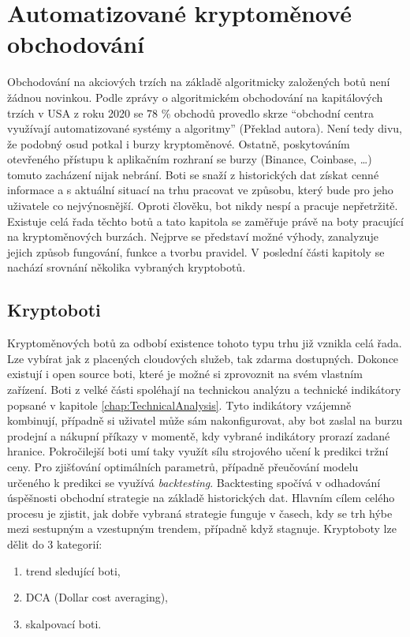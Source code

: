 \chapter{Automatizované kryptoměnové obchodování}
\label{sec:Cryptobots}
Obchodování na akciových trzích na základě algoritmicky založených botů není žádnou novinkou. Podle zprávy o algoritmickém obchodování na kapitálových trzích v USA z roku 2020 %
se 78 \% obchodů provedlo skrze \enquote{obchodní centra využívají automatizované systémy a algoritmy} (Překlad autora). Není tedy divu, že podobný osud potkal i burzy
kryptoměnové. Ostatně, poskytováním otevřeného přístupu k aplikačním rozhraní se burzy (Binance, Coinbase, \ldots) tomuto zacházení nijak nebrání. Boti se snaží z historických
dat získat cenné informace a s aktuální situací na trhu pracovat ve způsobu, který bude pro jeho uživatele co nejvýnosnější. Oproti člověku, bot nikdy nespí a pracuje
nepřetržitě. Existuje celá řada těchto botů a tato kapitola se zaměřuje právě na boty pracující na kryptoměnových burzách. Nejprve se představí možné výhody,
zanalyzuje jejich způsob fungování, funkce a tvorbu pravidel. V poslední části kapitoly se nachází srovnání několika vybraných kryptobotů.

\section{Kryptoboti}
Kryptoměnových botů za odbobí existence tohoto typu trhu již vznikla celá řada. Lze vybírat jak z placených cloudových služeb, tak zdarma dostupných. Dokonce existují i open
source boti, které je možné si zprovoznit na svém vlastním zařízení. Boti z velké části spoléhají na technickou analýzu a technické indikátory popsané v kapitole \ref{chap:TechnicalAnalysis}.
Tyto indikátory vzájemně kombinují, případně si uživatel může sám nakonfigurovat, aby bot zaslal na burzu prodejní a nákupní příkazy v momentě, kdy vybrané indikátory
prorazí zadané hranice. Pokročilejší boti umí taky využít sílu strojového učení k predikci tržní ceny. Pro zjišťování optimálních parametrů, případně přeučování modelu
určeného k predikci se využívá \emph{backtesting}. Backtesting spočívá v odhadování úspěšnosti obchodní strategie na základě historických dat. Hlavním cílem celého procesu
je zjistit, jak dobře vybraná strategie funguje v časech, kdy se trh hýbe mezi sestupným a vzestupným trendem, případně když stagnuje.
Kryptoboty lze dělit do 3 kategorií:
\begin{enumerate}
    \item trend sledující boti,
    \item DCA (Dollar cost averaging),
    \item skalpovací boti.
\end{enumerate}

